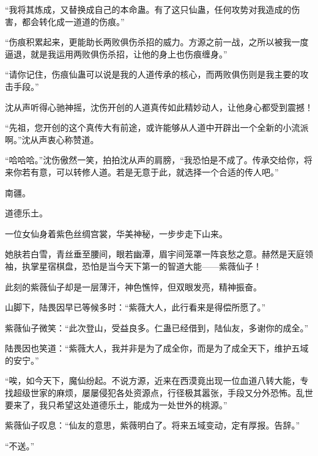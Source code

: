 \begin{this_body}
“我将其炼成，又替换成自己的本命蛊。有了这只仙蛊，任何攻势对我造成的伤害，都会转化成一道道的伤痕。”

“伤痕积累起来，更能助长两败俱伤杀招的威力。方源之前一战，之所以被我一度逼退，就是我运用两败俱伤杀招，让他的身上也伤痕缠身。”

“请你记住，伤痕仙蛊可以说是我的人道传承的核心，而两败俱伤则是我主要的攻击手段。”

沈从声听得心驰神摇，沈伤开创的人道真传如此精妙动人，让他身心都受到震撼！

“先祖，您开创的这个真传大有前途，或许能够从人道中开辟出一个全新的小流派啊。”沈从声衷心称赞道。

“哈哈哈。”沈伤傲然一笑，拍拍沈从声的肩膀，“我恐怕是不成了。传承交给你，将来你若有意，可以转修人道。若是无意于此，就选择一个合适的传人吧。”

南疆。

道德乐土。

一位女仙身着紫色丝绸宫裳，华美神秘，一步步走下山来。

她肤若白雪，青丝垂至腰间，眼若幽潭，眉宇间笼罩一阵哀愁之意。赫然是天庭领袖，执掌星宿棋盘，恐怕是当今天下第一的智道大能——紫薇仙子！

此刻的紫薇仙子却是一层薄汗，神色憔悴，但双眼发亮，精神振奋。

山脚下，陆畏因早已等候多时：“紫薇大人，此行看来是得偿所愿了。”

紫薇仙子微笑：“此次登山，受益良多。仁蛊已经借到，陆仙友，多谢你的成全。”

陆畏因也笑道：“紫薇大人，我并非是为了成全你，而是为了成全天下，维护五域的安宁。”

“唉，如今天下，魔仙纷起。不说方源，近来在西漠竟出现一位血道八转大能，专找超级世家的麻烦，屡屡侵犯各处资源点，行径极其嚣张，手段又分外恐怖。乱世要来了，我只希望这处道德乐土，能成为一处世外的桃源。”

紫薇仙子叹息：“仙友的意思，紫薇明白了。将来五域变动，定有厚报。告辞。”

“不送。”

\end{this_body}


